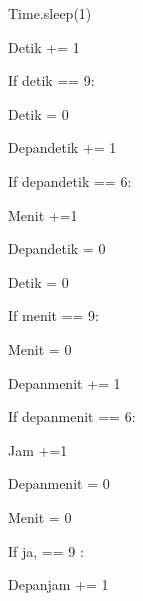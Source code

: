 \noindent 
{\fontsize{14pt}{14pt}\selectfont Time.sleep(1) \\} \par
\noindent 
{\fontsize{14pt}{14pt}\selectfont Detik += 1 \\} \par
\noindent 
{\fontsize{14pt}{14pt}\selectfont If detik == 9: \\} \par
\noindent 
{\fontsize{14pt}{14pt}\selectfont Detik = 0 \\} \par
\noindent 
{\fontsize{14pt}{14pt}\selectfont Depandetik += 1 \\} \par
\noindent 
{\fontsize{14pt}{14pt}\selectfont If depandetik == 6: \\} \par
\noindent 
{\fontsize{14pt}{14pt}\selectfont Menit +=1 \\} \par
\noindent 
{\fontsize{14pt}{14pt}\selectfont Depandetik = 0 \\} \par
\noindent 
{\fontsize{14pt}{14pt}\selectfont Detik = 0 \\} \par
\noindent 
{\fontsize{14pt}{14pt}\selectfont If menit == 9: \\} \par
\noindent 
{\fontsize{14pt}{14pt}\selectfont Menit = 0 \\} \par
\noindent 
{\fontsize{14pt}{14pt}\selectfont Depanmenit += 1 \\} \par
\noindent 
{\fontsize{14pt}{14pt}\selectfont If depanmenit == 6: \\} \par
\noindent 
{\fontsize{14pt}{14pt}\selectfont Jam +=1 \\} \par
\noindent 
{\fontsize{14pt}{14pt}\selectfont Depanmenit = 0 \\} \par
\noindent 
{\fontsize{14pt}{14pt}\selectfont Menit = 0 \\} \par
\noindent 
{\fontsize{14pt}{14pt}\selectfont If ja, == 9 : \\} \par
\noindent 
{\fontsize{14pt}{14pt}\selectfont Depanjam += 1 \\} \par
